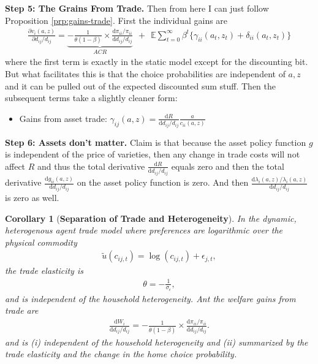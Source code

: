 \documentclass[12pt,pdftex]{article}
\newtheorem{corr}{Corollary}
\begin{document}
\begin{onehalfspacing}
\textbf{Step 5: The Grains From Trade.} Then from here I can just follow Proposition \ref{prp:gains-trade}. First the individual gains are
{\footnotesize
\begin{align}
\nonumber
\frac{\partial v_i(a, z)}{\partial d_{ij} / d_{ij}} = \underbrace{-\frac{1}{\theta (1-\beta)} \times \frac{\mathrm{d} \pi_{ii} / \pi_{ii}}{\mathrm{d}d_{ij} / d_{ij}}}_{ACR} \ \ + \ \
\mathbb{E} \sum_{t = 0}^{\infty} \beta^{t} \bigg \{ \gamma_{ii}(a_{t},z_{t}) + \delta_{ii}(a_{t},z_{t}) \bigg \}
\end{align}
}where the first term is exactly in the static model except for the discounting bit. But what facilitates this is that the choice probabilities are independent of $a,z$ and it can be pulled out of the expected discounted sum stuff. Then the subsequent terms take a slightly cleaner form:
\begin{itemize}
\item Gains from asset trade: $\gamma_{ij}(a,z) = \frac{\mathrm{d} R}{\mathrm{d} d_{ij} / d_{ij}}\frac{a}{c_{ii}(a,z)}$
\end{itemize}

\textbf{Step 6: Assets don't matter.} Claim is that because the asset policy function $g$ is independent of the price of varieties, then any change in trade costs will not affect $R$ and thus the total derivative $\frac{\mathrm{d} R}{\mathrm{d} d_{ij} / d_{ij}}$ equals zero and then the total derivative $\frac{\mathrm{d} g_{ii}(a,z)}{\mathrm{d} d_{ij} / d_{ij}}$ on the asset policy function is zero. And then $\frac{\mathrm{d} \lambda_{i}(a,z)/ \lambda_{i}(a,z)}{\mathrm{d} d_{ij} / d_{ij}}$ is zero as well.

\begin{corr}[\textbf{Separation of Trade and Heterogeneity}] In the dynamic, heterogenous agent trade model where preferences are logarithmic over the physical commodity
\begin{align}
\tilde{u}( c_{ij,t} ) =  \log(c_{ij,t}) + \epsilon_{j,t}, \nonumber
\end{align}
the trade elasticity is
\begin{align}
\theta = -\frac{1}{\sigma_{\epsilon}}, \nonumber
\end{align}
and is independent of the household heterogeneity. Ant the welfare gains from trade are
\begin{align}
\frac{\mathrm{d} W_{i}}{\mathrm{d} d_{ij} / d_{ij}} = -\frac{1}{\theta (1-\beta)} \times \frac{\mathrm{d} \pi_{ii} / \pi_{ii}}{\mathrm{d}d_{ij} / d_{ij}}. \nonumber
\end{align}
and is (i) independent of the household heterogeneity and (ii) summarized by the trade elasticity and the change in the home choice probability.
\end{corr}


\end{onehalfspacing}
\end{document}
